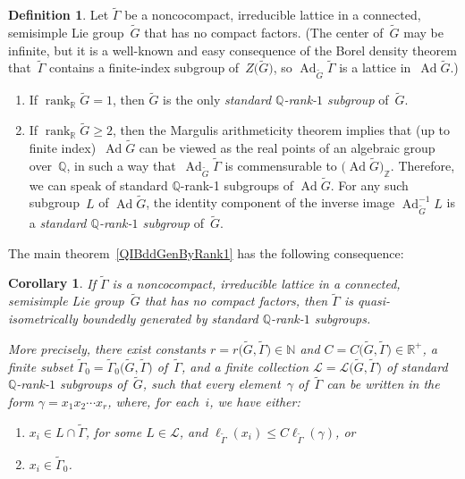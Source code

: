 \documentclass[pdftex]{sigma}
\newcommand{\NN}{\mathbb{N}}
\newcommand{\QQ}{\mathbb{Q}}
\newcommand{\RR}{\mathbb{R}}
\newcommand{\ZZ}{\mathbb{Z}}
\DeclareMathOperator{\Ad}{Ad}
\DeclareMathOperator{\rank}{rank}
\newcommand{\cover}{\widetilde}
\newcommand{\subgroups}{\mathcal{L}}
\numberwithin{equation}{section}
\newtheorem{cor}[thm]{Corollary}
\theoremstyle{definition}
\newtheorem{defn}[thm]{Definition}
\begin{document}
\begin{defn} \label{StandardQInfiniteCenterDefn} Let $\cover\Gamma$ be a noncocompact, irreducible lattice in a connected, semisimple Lie group~$\cover G$ that has no compact factors. (The center of~$\cover G$ may be infinite, but it is a well-known and easy consequence of the Borel density theorem that~$\cover\Gamma$ contains a finite-index subgroup of~$Z\big(\cover G\big)$, so $\Ad_{\cover G} \cover \Gamma$ is a lattice in~$\Ad \cover G$.)
\begin{enumerate}\itemsep=0pt
\item If $\rank_\RR \cover G = 1$, then $\cover G$ is the only \emph{standard $\QQ$-rank-$1$ subgroup} of~$\cover G$.
	\item If $\rank_\RR \cover G \ge 2$, then the Margulis arithmeticity theorem implies that (up to finite index)~$\Ad \cover G$ can be viewed as the real points of an algebraic group over~$\QQ$, in such a way that~$\Ad_{\cover G} \cover \Gamma$ is commensurable to $\big(\Ad \cover G\big)_\ZZ$.
Therefore, we can speak of standard $\QQ$-rank-1 subgroups of $\Ad \cover G$. For any such subgroup~$L$ of $\Ad \cover G$, the identity component of the inverse image $\Ad_{\cover G}^{-1} L$ is a \emph{standard $\QQ$-rank-$1$ subgroup} of~$\cover G$.
	\end{enumerate}
\end{defn}

The main theorem~\ref{QIBddGenByRank1} has the following consequence:

\begin{cor} \label{InfCenterBddGen}If $\cover\Gamma$ is a noncocompact, irreducible lattice in a connected, semisimple Lie group~$\cover G$ that has no compact factors, then $\cover\Gamma$ is quasi-isometrically boundedly generated by standard $\QQ$-rank-$1$ subgroups.

More precisely, there exist constants $r = r\big(\cover G,\cover\Gamma\big) \in \NN$ and $C = C\big(\cover G,\cover\Gamma\big) \in \RR^+$, a finite subset $\cover\Gamma_0 = \cover\Gamma_0\big(\cover G,\cover\Gamma\big)$ of~$\cover\Gamma$, and a finite collection $\subgroups = \subgroups\big(\cover G,\cover\Gamma\big)$ of standard $\QQ$-rank-$1$ subgroups of~$\cover G$, such that every element~$\gamma$ of~$\cover\Gamma$ can be written in the form $\gamma = x_1 x_2 \cdots x_r$, where, for each~$i$, we have either:
		\begin{enumerate}\itemsep=0pt
		\item[$1)$] %
		$x_i \in L \cap \cover\Gamma$, for some $L \in \subgroups$, and $\ell_{\cover\Gamma}(x_i) \le C \ell_{\cover\Gamma}(\gamma)$,
		or
		\item[$2)$] $x_i \in \cover\Gamma_0$.
		\end{enumerate}
\end{cor}
\end{document}
